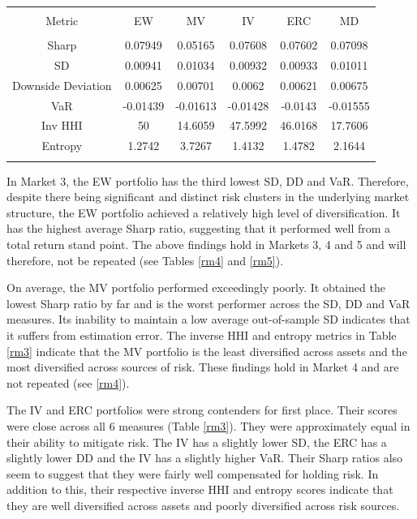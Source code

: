 \documentclass[11pt,preprint, authoryear]{elsarticle}
\let\origtable\table
\let\endorigtable\endtable
\renewenvironment{table}[1][2] {
    \expandafter\origtable\expandafter[H]
} {
    \endorigtable
}
\numberwithin{equation}{section}
\numberwithin{figure}{section}
\numberwithin{table}{section}
\begin{document}
\begin{table}[!htbp] \centering 
  \caption{Market 3 - Portfolio Risk Metrics} 
  \label{rm3} 
\begin{tabular}{@{\extracolsep{5pt}} cccccc} 
\\[-1.8ex]\hline 
\hline \\[-1.8ex] 
Metric & EW & MV & IV & ERC & MD \\ 
\hline \\[-1.8ex] 
Sharp & 0.07949 & 0.05165 & 0.07608 & 0.07602 & 0.07098 \\ 
SD & 0.00941 & 0.01034 & 0.00932 & 0.00933 & 0.01011 \\ 
Downside Deviation & 0.00625 & 0.00701 & 0.0062 & 0.00621 & 0.00675 \\ 
VaR & -0.01439 & -0.01613 & -0.01428 & -0.0143 & -0.01555 \\ 
Inv HHI & 50 & 14.6059 & 47.5992 & 46.0168 & 17.7606 \\ 
Entropy & 1.2742 & 3.7267 & 1.4132 & 1.4782 & 2.1644 \\ 
\hline \\[-1.8ex] 
\end{tabular} 
\end{table}

In Market 3, the EW portfolio has the third lowest SD, DD and VaR.
Therefore, despite there being significant and distinct risk clusters in
the underlying market structure, the EW portfolio achieved a relatively
high level of diversification. It has the highest average Sharp ratio,
suggesting that it performed well from a total return stand point. The
above findings hold in Markets 3, 4 and 5 and will therefore, not be
repeated (see Tables \ref{rm4} and \ref{rm5}).

On average, the MV portfolio performed exceedingly poorly. It obtained
the lowest Sharp ratio by far and is the worst performer across the SD,
DD and VaR measures. Its inability to maintain a low average
out-of-sample SD indicates that it suffers from estimation error. The
inverse HHI and entropy metrics in Table \ref{rm3} indicate that the MV
portfolio is the least diversified across assets and the most
diversified across sources of risk. These findings hold in Market 4 and
are not repeated (see \ref{rm4}).

The IV and ERC portfolios were strong contenders for first place. Their
scores were close across all 6 measures (Table \ref{rm3}). They were
approximately equal in their ability to mitigate risk. The IV has a
slightly lower SD, the ERC has a slightly lower DD and the IV has a
slightly higher VaR. Their Sharp ratios also seem to suggest that they
were fairly well compensated for holding risk. In addition to this,
their respective inverse HHI and entropy scores indicate that they are
well diversified across assets and poorly diversified across risk
sources.
\end{document}
